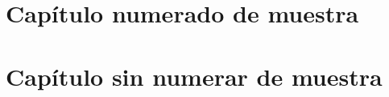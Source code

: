 \documentclass[10pt]{book}
\begin{document}
\chapter{Capítulo numerado de muestra}

\lipsum\lipsum

\chapter*{Capítulo sin numerar de muestra}

\lipsum\lipsum
\end{document}
